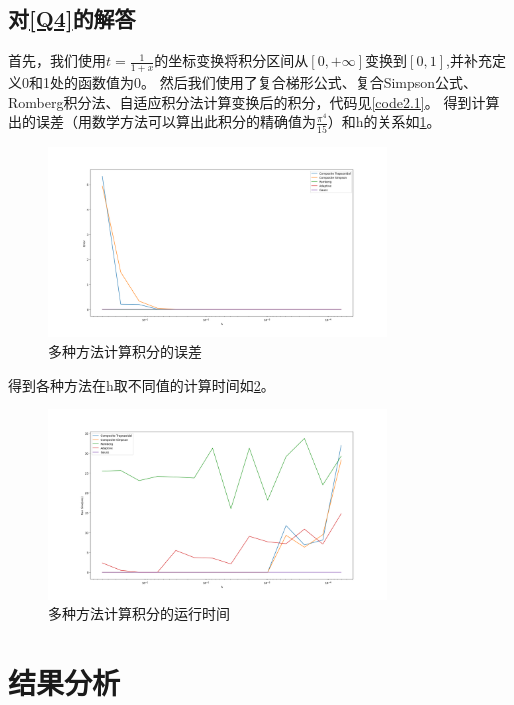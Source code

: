 \documentclass[a4paper,11pt,notitlepage]{article}
\begin{document}
\subsection{对\ref{Q4}的解答}
首先，我们使用$t=\frac{1}{1+x}$的坐标变换将积分区间从$[0,+\infty]$变换到$[0,1]$,并补充定义0和1处的函数值为0。
然后我们使用了复合梯形公式、复合Simpson公式、Romberg积分法、自适应积分法计算变换后的积分，代码见\cref{code2.1}。
得到计算出的误差（用数学方法可以算出此积分的精确值为$\frac{\pi^4}{15}$）和h的关系如\cref{pic:4}。
\begin{figure}[H]
    \centering
    \includegraphics[width=0.8\textwidth]{../picture/Fifth_Chapter_2.png}
    \caption{多种方法计算积分的误差}
    \label{pic:4}
\end{figure}
得到各种方法在h取不同值的计算时间如\cref{pic:5}。
\begin{figure}[H]
    \centering
    \includegraphics[width=0.8\textwidth]{../picture/Fifth_Chapter_2(1).png}
    \caption{多种方法计算积分的运行时间}
    \label{pic:5}
\end{figure}

\section{结果分析}
\end{document}

